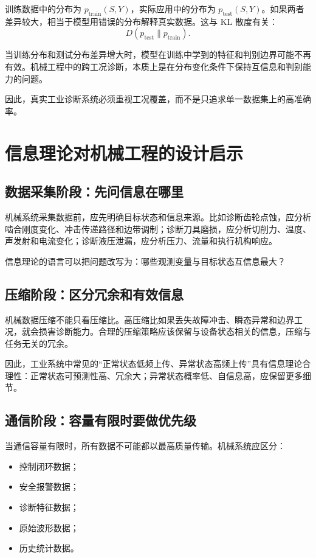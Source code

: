 \documentclass[UTF8,a4paper,12pt]{ctexart}
\begin{document}
训练数据中的分布为 $p_{\mathrm{train}}(S,Y)$，实际应用中的分布为 $p_{\mathrm{test}}(S,Y)$。如果两者差异较大，相当于模型用错误的分布解释真实数据。这与 KL 散度有关：
\begin{equation}
D(p_{\mathrm{test}}\|p_{\mathrm{train}}).
\end{equation}

当训练分布和测试分布差异增大时，模型在训练中学到的特征和判别边界可能不再有效。机械工程中的跨工况诊断，本质上是在分布变化条件下保持互信息和判别能力的问题。

因此，真实工业诊断系统必须重视工况覆盖，而不是只追求单一数据集上的高准确率。

\section{信息理论对机械工程的设计启示}

\subsection{数据采集阶段：先问信息在哪里}

机械系统采集数据前，应先明确目标状态和信息来源。比如诊断齿轮点蚀，应分析啮合刚度变化、冲击传递路径和边带调制；诊断刀具磨损，应分析切削力、温度、声发射和电流变化；诊断液压泄漏，应分析压力、流量和执行机构响应。

信息理论的语言可以把问题改写为：哪些观测变量与目标状态互信息最大？

\subsection{压缩阶段：区分冗余和有效信息}

机械数据压缩不能只看压缩比。高压缩比如果丢失故障冲击、瞬态异常和边界工况，就会损害诊断能力。合理的压缩策略应该保留与设备状态相关的信息，压缩与任务无关的冗余。

因此，工业系统中常见的“正常状态低频上传、异常状态高频上传”具有信息理论合理性：正常状态可预测性高、冗余大；异常状态概率低、自信息高，应保留更多细节。

\subsection{通信阶段：容量有限时要做优先级}

当通信容量有限时，所有数据不可能都以最高质量传输。机械系统应区分：
\begin{itemize}
  \item 控制闭环数据；
  \item 安全报警数据；
  \item 诊断特征数据；
  \item 原始波形数据；
  \item 历史统计数据。
\end{itemize}
\end{document}

